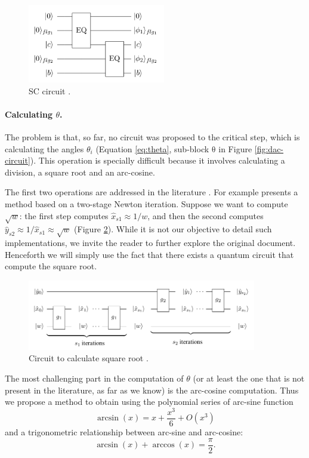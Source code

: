 \documentclass[a4paper, 10pt]{article}
\numberwithin{equation}{section}
\numberwithin{figure}{section}
\numberwithin{table}{section}
\begin{document}
\begin{figure}[h!]
	\centering
	\includegraphics[width=6cm]{Figures/sc-circuit}
	\caption{SC circuit \cite{chiang}.}
	\label{fig:sc-circuit}
\end{figure}

\paragraph{Calculating $\theta$.}
The problem is that, so far, no circuit was proposed to the critical step, which is calculating the angles $\theta_i$ (Equation \ref{eq:theta}, sub-block $\mathrm{\theta}$ in Figure \ref{fig:dac-circuit}). This operation is specially difficult because it involves calculating a division, a square root and an arc-cosine.

The first two operations are addressed in the literature \cite{gokhale, hadfield}. For example \cite{hadfield} presents a method based on a two-stage Newton iteration. Suppose we want to compute $\sqrt{w}$: the first step computes $\hat{x}_{s1}\approx 1/w$, and then the second computes $\hat{y}_{s2}\approx1/\hat{x}_{s1}\approx\sqrt{w}$ (Figure \ref{fig:sqrt}). While it is not our objective to detail such implementations, we invite the reader to further explore the original document. Henceforth we will simply use the fact that there exists a quantum circuit that compute the square root.

\begin{figure}[h!]
	\centering
	\includegraphics[width=10cm]{Figures/square-root}
	\caption{Circuit to calculate square root \cite{hadfield}.}
	\label{fig:sqrt}
\end{figure}

The most challenging part in the computation of $\theta$ (or at least the one that is not present in the literature, as far as we know) is the arc-cosine computation. Thus we propose a method to obtain using the polynomial series of arc-sine function
\begin{equation}
\arcsin(x) = x +\frac{x^3}{6} + O(x^3)
\end{equation}
and a trigonometric relationship between arc-sine and arc-cosine:
\begin{equation}
	\arcsin(x) + \arccos(x) = \frac{\pi}{2}.
\end{equation}
\end{document}
